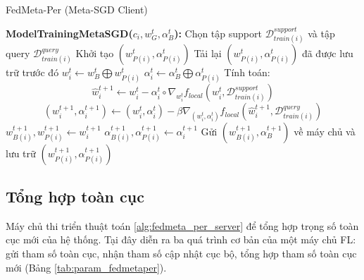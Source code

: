\begin{algorithm}[H]
    \caption{FedMeta-Per (Meta-SGD Client)} \label{alg:fedsgd_per_client}
    \begin{algorithmic}[1]
        \State\textbf{ModelTrainingMetaSGD($c_i, w_G^t, \alpha_B^t$):}
        \State Chọn tập support $\mathcal{D}_{train(i)}^{support}$ và tập query $\mathcal{D}_{train(i)}^{query}$
            \State Khởi tạo $(w_{P(i)}^t, \alpha_{P(i)}^t)$
        \Else
            \State Tải lại $(w_{P(i)}^t, \alpha_{P(i)}^t)$ đã được lưu trữ trước đó
        \EndIf
        \State $w_i^t \gets w_B^t \bigoplus w_{P(i)}^t$ 
        \State $\alpha_i^t \gets \alpha_B^t \bigoplus \alpha_{P(i)}^t$ 
        \State Tính toán:
        \begin{dmath*}
            \hat{w}_{i}^{t+1} \gets w_{i}^t - \alpha_i^t\circ\nabla_{w_i^t} f_{local}\left(w_{i}^t, \mathcal{D}_{train(i)}^{support}\right)
        \end{dmath*}
        \begin{dmath*}
            (w_{i}^{t+1}, \alpha_i^{t+1}) \gets (w_{i}^t, \alpha_{i}^{t}) - \beta\nabla_{(w_i^t, \alpha_i^t)} f_{local}\left(\hat{w}_{i}^{t+1}, \mathcal{D}_{train(i)}^{query}\right)
        \end{dmath*}
        \State $w_{B(i)}^{t+1}, w_{P(i)}^{t+1} \gets w_i^{t+1}$ 
        \State $\alpha_{B(i)}^{t+1}, \alpha_{P(i)}^{t+1} \gets \alpha_i^{t+1}$ 
        \State Gửi $(w_{B(i)}^{t+1}, \alpha_B^{t+1})$ về máy chủ và lưu trữ $(w_{P(i)}^{t+1}, \alpha_{P(i)}^{t+1})$
    \end{algorithmic}
\end{algorithm}

\subsection{Tổng hợp toàn cục}

Máy chủ thi triển thuật toán \ref{alg:fedmeta_per_server} để tổng hợp trọng số toàn cục mới của hệ thống. Tại đây diễn ra ba quá trình cơ bản của một máy chủ FL: gửi tham số toàn cục, nhận tham số cập nhật cục bộ, tổng hợp tham số toàn cục mới (Bảng \ref{tab:param_fedmetaper}).

